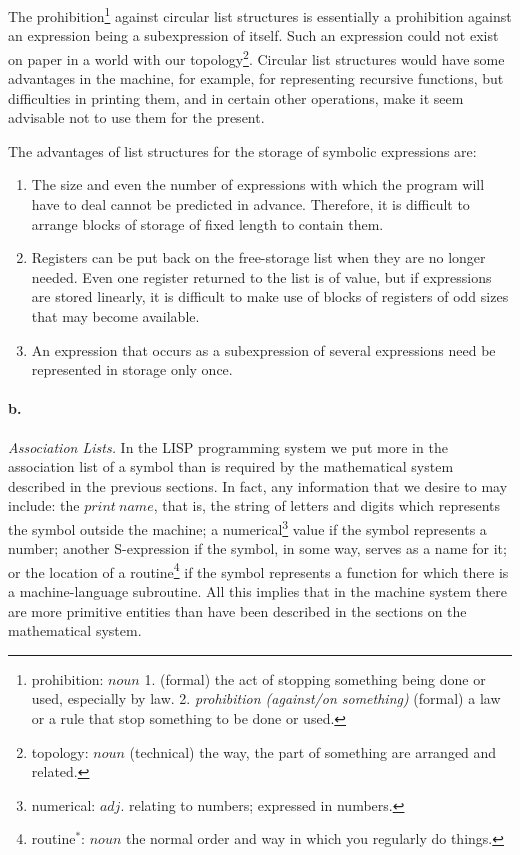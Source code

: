 \documentclass[11pt, a4paper]{article}
\begin{document}
The
prohibition\footnote{prohibition: $noun$ 1. (formal) the act of stopping
  something being done or used, especially by law. 2. \textit{prohibition
    (against/on something)} (formal) a law or a rule that stop something to be
  done or used.}
against circular list structures is essentially a prohibition
against an expression being a subexpression of itself. Such an expression could
not exist on paper in a world with our
topology\footnote{topology: $noun$ (technical) the way, the part of something
  are arranged and related.}.
Circular list structures would
have some advantages in the machine, for example, for representing recursive
functions, but difficulties in printing them, and in certain other operations,
make it seem advisable not to use them for the present.

The advantages of list structures for the storage of symbolic expressions are:
\begin{enumerate}
\item The size and even the number of expressions with which the program will
  have to deal cannot be predicted in advance. Therefore, it is difficult to
  arrange blocks of storage of fixed length to contain them.
\item Registers can be put back on the free-storage list when they are no longer
  needed. Even one register returned to the list is of value, but if expressions
  are stored linearly, it is difficult to make use of blocks of registers of odd
  sizes that may become available.
\item An expression that occurs as a subexpression of several expressions need
  be represented in storage only once.
\end{enumerate}

\paragraph{b.}\textit{Association Lists.}
In the LISP programming system we put more in the association list of a symbol
than is required by the mathematical system described in the previous
sections. In fact, any information that we desire to may include: the $print
\ name$, that is, the string of letters and digits which represents the symbol
outside the machine; a
numerical\footnote{numerical: $adj.$ relating to numbers; expressed in numbers.}
value if the symbol represents a number;
another S-expression if the symbol, in some way, serves as a name for it; or the
location of a
routine\footnote{routine$^*$: $noun$ the normal order and way in which you
  regularly do things.}
if the symbol represents a function for which there is a
machine-language subroutine. All this implies that in the machine system there
are more primitive entities than have been described in the sections on the
mathematical system.
\end{document}

